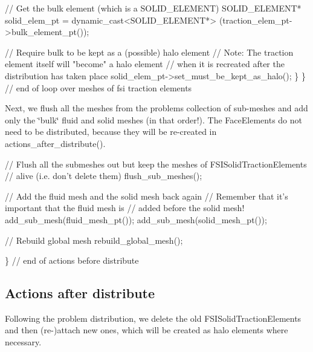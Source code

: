 \begin{DoxyCodeInclude}
     \textcolor{comment}{// Get the bulk element (which is a SOLID\_ELEMENT)}
     SOLID\_ELEMENT* solid\_elem\_pt = \textcolor{keyword}{dynamic\_cast<}SOLID\_ELEMENT*\textcolor{keyword}{>}
      (traction\_elem\_pt->bulk\_element\_pt());

     \textcolor{comment}{// Require bulk to be kept as a (possible) halo element}
     \textcolor{comment}{// Note: The traction element itself will "become" a halo element }
     \textcolor{comment}{// when it is recreated after the distribution has taken place}
     solid\_elem\_pt->set\_must\_be\_kept\_as\_halo();
    \}
  \} \textcolor{comment}{// end of loop over meshes of fsi traction elements}

\end{DoxyCodeInclude}


Next, we flush all the meshes from the problem\textquotesingle{}s collection of sub-\/meshes and add only the \char`\"{}bulk\char`\"{} fluid and solid meshes (in that order!). The {\ttfamily Face\+Elements} do not need to be distributed, because they will be re-\/created in {\ttfamily actions\+\_\+after\+\_\+distribute()}.


\begin{DoxyCodeInclude}
 

 \textcolor{comment}{// Flush all the submeshes out but keep the meshes of FSISolidTractionElements}
 \textcolor{comment}{// alive (i.e. don't delete them)}
 flush\_sub\_meshes();

 \textcolor{comment}{// Add the fluid mesh and the solid mesh back again}
 \textcolor{comment}{// Remember that it's important that the fluid mesh is}
 \textcolor{comment}{// added before the solid mesh!}
 add\_sub\_mesh(fluid\_mesh\_pt());
 add\_sub\_mesh(solid\_mesh\_pt());

 \textcolor{comment}{// Rebuild global mesh}
 rebuild\_global\_mesh();

\} \textcolor{comment}{// end of actions before distribute}

\end{DoxyCodeInclude}




\hypertarget{index_actions_after_distribute}{}\subsection{Actions after distribute}\label{index_actions_after_distribute}
Following the problem distribution, we delete the old {\ttfamily F\+S\+I\+Solid\+Traction\+Elements} and then (re-\/)attach new ones, which will be created as halo elements where necessary.

